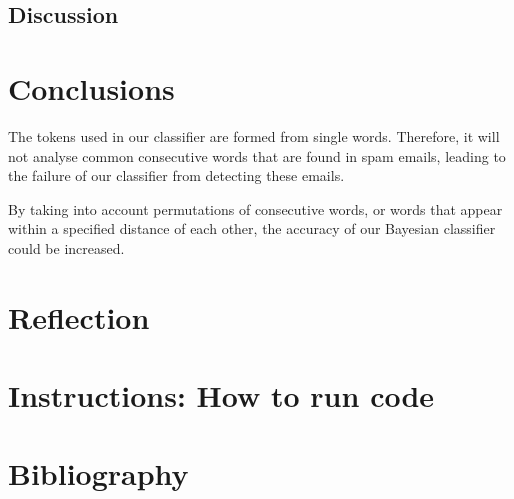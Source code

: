 \documentclass[10pt, a4paper]{article}
\begin{document}
\subsection{Discussion}

\section{Conclusions}

The tokens used in our classifier are formed from single words. Therefore, it will not analyse common consecutive words that are found in spam emails, leading to the failure of our classifier from detecting these emails.

By taking into account permutations of consecutive words, or words that appear within a specified distance of each other, the accuracy of our Bayesian classifier could be increased.

\section{Reflection}

\section{Instructions: How to run code}

\section{Bibliography}
\end{document}
